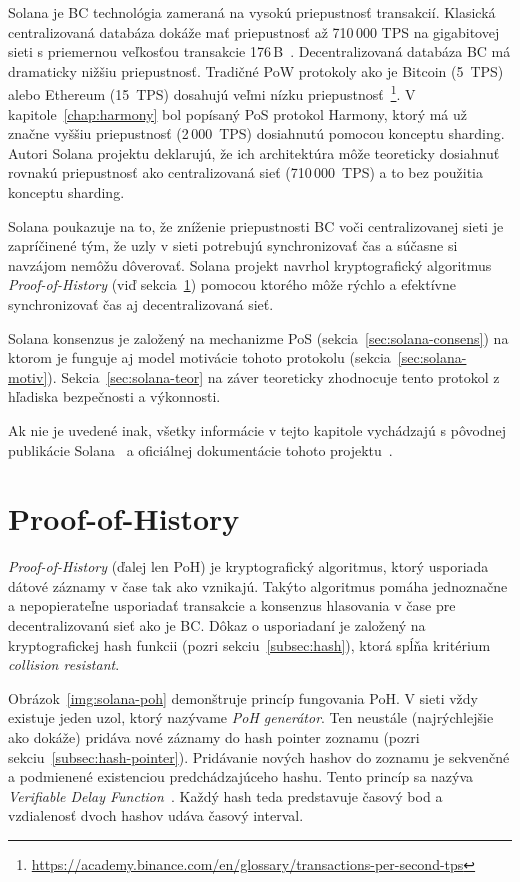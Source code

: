Solana je BC technológia zameraná na vysokú priepustnosť transakcií. Klasická centralizovaná databáza dokáže mať priepustnosť až 710\,000 TPS na gigabitovej sieti s priemernou veľkosťou transakcie 176\,B~\cite{solanaDoc}. Decentralizovaná databáza BC má dramaticky nižšiu priepustnosť. Tradičné PoW protokoly ako je Bitcoin (5~TPS) alebo Ethereum (15~TPS) dosahujú veľmi nízku priepustnosť~\footnote{\url{https://academy.binance.com/en/glossary/transactions-per-second-tps}}.  V kapitole~\ref{chap:harmony} bol popísaný PoS protokol Harmony, ktorý má už značne vyššiu priepustnosť (2\,000~TPS) dosiahnutú pomocou konceptu sharding. Autori Solana projektu deklarujú, že ich architektúra môže teoreticky dosiahnuť rovnakú priepustnosť ako centralizovaná sieť (710\,000~TPS) a to bez použitia konceptu sharding.

Solana poukazuje na to, že zníženie priepustnosti BC voči centralizovanej sieti je zapríčinené tým, že uzly v sieti potrebujú synchronizovať čas a súčasne si navzájom nemôžu dôverovať. Solana projekt navrhol kryptografický algoritmus \textit{Proof-of-History} (viď sekcia~\ref{sec:solana-poh}) pomocou ktorého môže rýchlo a efektívne synchronizovať čas aj decentralizovaná sieť.

Solana konsenzus je založený na mechanizme PoS (sekcia~\ref{sec:solana-consens}) na ktorom je funguje aj model motivácie tohoto protokolu (sekcia~\ref{sec:solana-motiv}). Sekcia~\ref{sec:solana-teor} na záver teoreticky zhodnocuje tento protokol z hľadiska bezpečnosti a výkonnosti.

Ak nie je uvedené inak, všetky informácie v tejto kapitole vychádzajú s pôvodnej publikácie Solana~\cite{solanaWp} a oficiálnej dokumentácie tohoto projektu~\cite{solanaDoc}.

\section{Proof-of-History}\label{sec:solana-poh}

\textit{Proof-of-History} (ďalej len PoH) je kryptografický algoritmus, ktorý usporiada dátové záznamy v čase tak ako vznikajú. Takýto algoritmus pomáha jednoznačne a nepopierateľne usporiadať transakcie a konsenzus hlasovania v čase pre decentralizovanú sieť ako je BC. Dôkaz o usporiadaní je založený na kryptografickej hash funkcii (pozri sekciu~\ref{subsec:hash}), ktorá spĺňa kritérium \textit{collision resistant}.

Obrázok~\ref{img:solana-poh} demonštruje princíp fungovania PoH. V sieti vždy existuje jeden uzol, ktorý nazývame \textit{PoH generátor}. Ten neustále (najrýchlejšie ako dokáže) pridáva nové záznamy do hash pointer zoznamu (pozri sekciu~\ref{subsec:hash-pointer}). Pridávanie nových hashov do zoznamu je sekvenčné a podmienené existenciou predchádzajúceho hashu. Tento princíp sa nazýva \textit{Verifiable Delay Function~\cite{vdfBoneh}}. Každý hash teda predstavuje časový bod a vzdialenosť dvoch hashov udáva časový interval.

